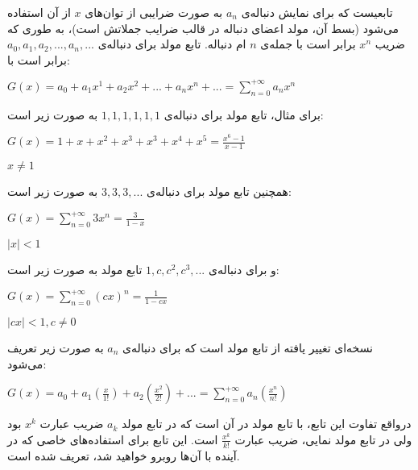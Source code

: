 
\begin{definition}
    \p
    تابعیست که برای نمایش دنباله‌ی 
    $a_{n}$ 
    به صورت ضرایبی از توان‌های 
    $x$
    از آن استفاده می‌شود (بسط آن، مولد اعضای دنباله در قالب ضرایب جملاتش است)، به طوری که ضریب 
    $x^{n}$
    برابر است با جمله‌ی
    $n$
    ام دنباله. تابع مولد برای دنباله‌ی 
    $a_{0}, a_{1}, a_{2}, ..., a_{n}, ... $
    برابر است با:
    \begin{center}
        $G(x)= a_{0} + a_{1}x^{1} + a_{2}x^{2} + ... + a_{n}x^{n} + ... = \sum			\limits_{n=0}^{+\infty} a_{n}x^{n}$
    \end{center}
\end{definition}
\p
برای مثال،
تابع مولد برای دنباله‌ی 
$1, 1, 1, 1, 1, 1$ 
به صورت زیر است:
\begin{center}
    $G(x)= 1 + x + x^2 + x^3 + x^3 + x^4 + x^5 = \frac{x^6-1}{x-1}$
    
    $x \neq 1$	
\end{center}

همچنین
تابع مولد برای دنباله‌ی 
$3, 3, 3, ...$
به صورت زیر است: 
\begin{center}
    $G(x)= \sum\limits_{n=0}^{+\infty} 3x^{n} = \frac{3}{1-x}$
    
    $|x| < 1$	
\end{center}

و برای دنباله‌ی 
$1, c, c^2, c^3, ...$
تابع مولد به صورت زیر است: 
\begin{center}
    $G(x)= \sum\limits_{n=0}^{+\infty} (cx)^{n} = \frac{1}{1-cx}$
            
    $|cx| < 1 , c \neq 0$
\end{center}









\begin{definition}
    \p
    نسخه‌ای تغییر یافته از تابع مولد است که
    برای دنباله‌ی 
    $a_{n}$
    به صورت زیر تعریف می‌شود:
    \begin{center}
      $G(x)= a_{0} + a_{1}(\frac{x}{1!}) + a_{2}(\frac{x^{2}}{2!}) + ... = 
      \sum\limits_{n=0}^{+\infty} a_{n}(\frac{x^{n}}{n!})$
    \end{center}
\end{definition}
\p
درواقع تفاوت این تابع، با تابع مولد در آن است که در تابع مولد
$a_k$
ضریب عبارت
$x^k$
بود ولی در تابع مولد نمایی، ضریب عبارت
$\frac{x^k}{k!}$
است.
این تابع برای
استفاده‌های خاصی که در آینده با آن‌ها روبرو خواهید شد،
تعریف شده است.

